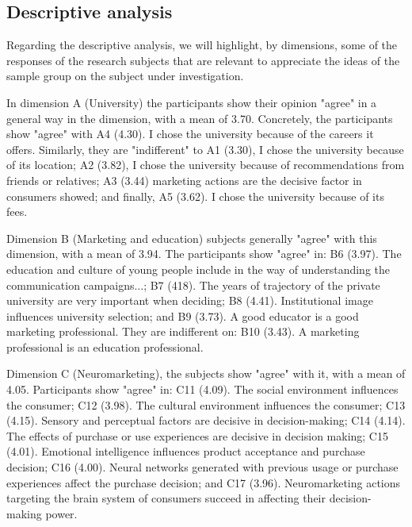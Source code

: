 \documentclass[english]{textolivre}
\begin{document}
\subsection{Descriptive analysis}

Regarding the descriptive analysis, we will highlight, by dimensions, some of the responses of the research subjects that are relevant to appreciate the ideas of the sample group on the subject under investigation.

In dimension A (University) the participants show their opinion "agree" in a general way in the dimension, with a mean of 3.70. Concretely, the participants show "agree" with A4 (4.30). I chose the university because of the careers it offers. Similarly, they are "indifferent" to A1 (3.30), I chose the university because of its location; A2 (3.82), I chose the university because of recommendations from friends or relatives; A3 (3.44) marketing actions are the decisive factor in consumers showed; and finally, A5 (3.62). I chose the university because of its fees.

Dimension B (Marketing and education) subjects generally "agree" with this dimension, with a mean of 3.94. The participants show "agree" in: B6 (3.97). The education and culture of young people include in the way of understanding the communication campaigns...; B7 (418). The years of trajectory of the private university are very important when deciding; B8 (4.41). Institutional image influences university selection; and B9 (3.73). A good educator is a good marketing professional. They are indifferent on: B10 (3.43). A marketing professional is an education professional.

Dimension C (Neuromarketing), the subjects show "agree" with it, with a mean of 4.05. Participants show "agree" in: C11 (4.09). The social environment influences the consumer; C12 (3.98). The cultural environment influences the consumer; C13 (4.15). Sensory and perceptual factors are decisive in decision-making; C14 (4.14). The effects of purchase or use experiences are decisive in decision making; C15 (4.01). Emotional intelligence influences product acceptance and purchase decision; C16 (4.00). Neural networks generated with previous usage or purchase experiences affect the purchase decision; and C17 (3.96). Neuromarketing actions targeting the brain system of consumers succeed in affecting their decision-making power.
\end{document}

